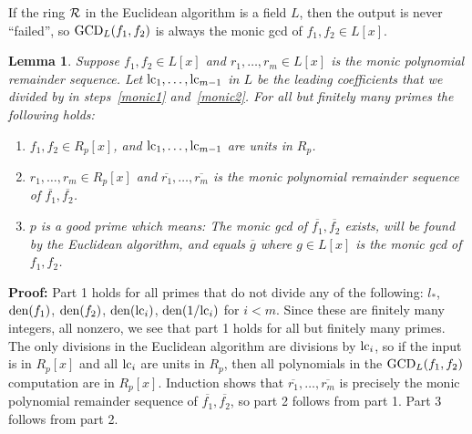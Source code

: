 \documentclass[10pt]{article}
\newtheorem{lemma}{Lemma}
\newcommand{\x}{x}
\newcommand{\EuclAlg}{{\rm GCD}}
\begin{document}
If the ring ${\cal R}$ in the Euclidean algorithm is a field $L$,
then the output is never ``failed'', so $\EuclAlg_L(f_1,f_2)$ is
always the monic gcd of $f_1,f_2 \in L[x]$.
\begin{lemma}
\label{finitep}
Suppose $f_1,f_2 \in L[\x]$ and $r_1,\ldots,r_m \in L[\x]$
is the monic polynomial remainder sequence. Let ${\rm lc}_1,\ldots,{\rm 
lc}_{m-1}$ in $L$
be the leading coefficients that we divided by in steps~\ref{monic1} 
and~\ref{monic2}.
For all but finitely many primes the following holds:
\begin{enumerate}
\item $f_1,f_2 \in R_p[\x]$, and ${\rm lc}_1,\ldots,{\rm lc}_{m-1}$ are units in $R_p$.
\item $r_1,\ldots,r_m \in R_p[\x]$ and $\overline{r_1},\ldots,\overline{r_m}$
is the monic polynomial remainder sequence of $\overline{f_1},\overline{f_2}$.
\item $p$ is a {\em good prime} which means:
The monic gcd of $\overline{f_1},\overline{f_2}$ exists, will be found
by the Euclidean algorithm, and equals $\overline{g}$ where $g \in L[x]$ is the monic
gcd of $f_1,f_2$.
\end{enumerate}
\end{lemma}
{\bf Proof:} Part 1 holds for all primes that
do not divide any of the following:
$l_*$, ${\rm den}(f_1)$, ${\rm den}(f_2)$, ${\rm den}({\rm lc}_i)$, ${\rm den}(1/{\rm lc}_i)$
for $i<m$. Since these are finitely many
integers, all nonzero, we see that part 1 holds for all but finitely
many primes.
The only divisions in the Euclidean algorithm are divisions
by ${\rm lc}_i$, so if the input is in $R_p[\x]$
and all ${\rm lc}_i$ are units in $R_p$, then all polynomials
in the $\EuclAlg_L(f_1,f_2)$ computation are in $R_p[\x]$.
Induction shows that
$\overline{r_1},\ldots,\overline{r_m}$
is precisely the monic polynomial remainder sequence of $\overline{f_1},\overline{f_2}$, so part 2 follows from part 1.
Part 3 follows from part 2.
\\
\end{document}
